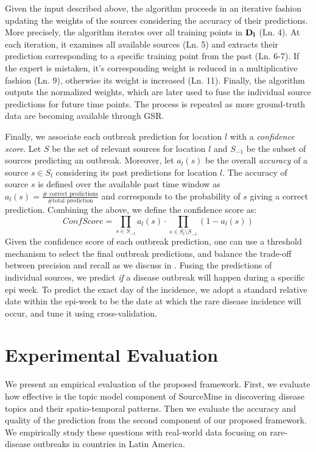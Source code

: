 \documentclass[conference]{IEEEtran}
\newcommand{\fullmodel}{{{\sf SourceMine}}\xspace}
\begin{document}
Given the input described above, the algorithm proceeds in an iterative fashion updating the weights of the sources considering the accuracy of their predictions. More precisely, the algorithm iterates over all training points in ${\bf D_l}$ (Ln. 4).  At each iteration, it examines all available sources (Ln. 5) and extracts their prediction corresponding to a specific training point from the past (Ln. 6-7). If the expert is mistaken, it's corresponding weight is reduced in a multiplicative fashion (Ln. 9), otherwise its weight is increased (Ln. 11). Finally, the algorithm outputs the normalized weights, which are later used to fuse the individual source predictions for future time points. The process is repeated as more ground-truth data are becoming available through GSR.

Finally, we associate each outbreak prediction for location $l$ with a {\em confidence score}. Let $S$ be the set of relevant sources for location $l$ and $S_{-1}$ be the subset of sources predicting an outbreak. Moreover, let $a_l(s)$ be the overall {\em accuracy} of a source $s \in S_l$ considering its past predictions for location $l$. The accuracy of source $s$ is defined over the available past time window as $a_l(s) = \frac{\#\mbox{ correct predictions}}{\#\mbox{total prediction}}$ and corresponds to the probability of $s$ giving a correct prediction. Combining the above, we define the confidence score as: 
\begin{equation}
ConfScore = \prod_{s \in S_{-1}}a_l(s) \cdot \prod_{s \in S_l \setminus S_{-1}} (1 - a_l(s))
\label{eq:conf}
\end{equation}
Given the confidence score of each outbreak prediction, one can use a threshold mechanism to select the final outbreak predictions, and balance the trade-off between precision and recall as we discuss in . Fusing the predictions of individual sources, we predict  {\em if} a disease outbreak will happen during a specific epi week. To predict the exact day of the incidence, we adopt a standard relative date within the epi-week to be the date at which the rare disease incidence will occur, and tune it using cross-validation. 


\section{Experimental Evaluation}
\label{sec:exp}
We present an empirical evaluation of the proposed framework. First, we evaluate how effective is the topic model component of \fullmodel in discovering disease topics and their spatio-temporal patterns. Then we evaluate the accuracy and quality of the prediction from the second component of our proposed framework. We empirically study these questions with real-world data focusing on rare-disease outbreaks in countries in Latin America.
\end{document}
